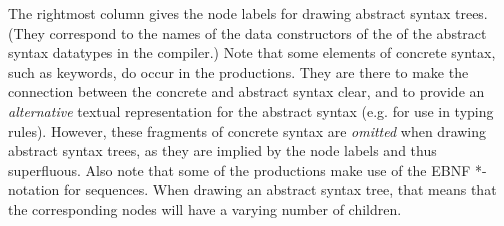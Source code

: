 \documentclass[12pt,a4paper]{article}%
\begin{document}
The rightmost column gives the node labels for drawing abstract syntax trees. 
(They correspond to the names of the data constructors of the of the abstract
syntax datatypes in the compiler.) Note that some elements of concrete syntax,
such as keywords, do occur in the productions. They are there to make the
connection between the concrete and abstract syntax clear, and to provide an
\emph{alternative} textual representation for the abstract syntax (e.g. for
use in typing rules). However, these fragments of concrete syntax are
\emph{omitted} when drawing abstract syntax trees, as they are implied by the
node labels and thus superfluous. Also note that some of the productions make
use of the EBNF *-notation for sequences. When drawing an abstract syntax
tree, that means that the corresponding nodes will have a varying number of
children.


\end{document}
